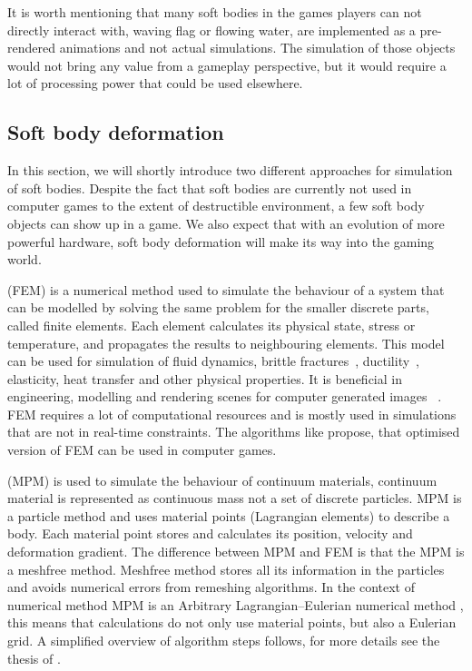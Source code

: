 It is worth mentioning that many soft bodies in the games players can not directly interact with, \eg waving flag or flowing water, are implemented as a pre-rendered animations and not actual simulations. The simulation of those objects would not bring any value from a gameplay perspective, but it would require a lot of processing power that could be used elsewhere. 

\subsection{Soft body deformation}
In this section, we will shortly introduce two different approaches for simulation of soft bodies. Despite the fact that soft bodies are currently not used in computer games to the extent of destructible environment, a few soft body objects can show up in a game. We also expect that with an evolution of more powerful hardware, soft body deformation will make its way into the gaming world.
\label{sec:softBody}

 (FEM) is a numerical method used to simulate the behaviour of a system that can be modelled by solving the same problem for the smaller discrete parts, called finite elements. Each element calculates its physical state, \eg stress or temperature, and propagates the results to neighbouring elements. This model can be used for simulation of fluid dynamics, brittle fractures~\cite{brittlefracture}, ductility~\cite{ductilefracture}, elasticity, heat transfer and other physical properties. It is beneficial in engineering, modelling and rendering scenes for computer generated images ~\cite{Bargteil:2007:AFE}. 
FEM requires a lot of computational resources and is mostly used in simulations that are not in real-time constraints. The algorithms like \citet{femingames} propose, that optimised version of FEM can be used in computer games. 

 (MPM) is used to simulate the behaviour of continuum materials, continuum material is represented as continuous mass not a set of discrete particles. MPM is a particle method and uses material points (Lagrangian elements) to describe a body. Each material point stores and calculates its position, velocity and deformation gradient. The difference between MPM and FEM is that the MPM is a meshfree method. Meshfree method stores all its information in the particles and avoids numerical errors from remeshing algorithms. In the context of numerical method MPM is an Arbitrary Lagrangian–Eulerian numerical method \cite{ALE}, this means that calculations do not only use material points, but also a Eulerian grid. A simplified overview of algorithm steps follows, for more details see the thesis of \citet{jiang2015material}.

